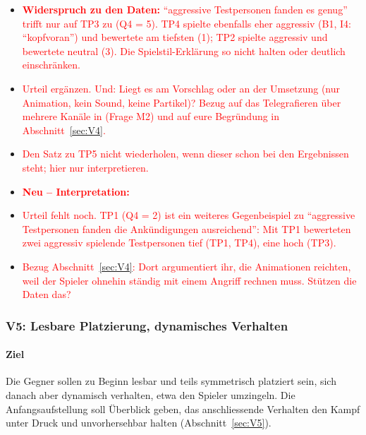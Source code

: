 \documentclass[../Main.tex]{subfiles}
\begin{document}
\begin{itemize}[leftmargin=1.5cm]
    \item \textcolor{red}{\textbf{Widerspruch zu den Daten:} \enquote{aggressive Testpersonen fanden es genug} trifft nur auf TP3 zu (Q4 = 5). TP4 spielte ebenfalls eher aggressiv (B1, I4: \enquote{kopfvoran}) und bewertete am tiefsten (1); TP2 spielte aggressiv und bewertete neutral (3). Die Spielstil-Erklärung so nicht halten oder deutlich einschränken.}
    \item \textcolor{red}{Urteil ergänzen. Und: Liegt es am Vorschlag oder an der Umsetzung (nur Animation, kein Sound, keine Partikel)? Bezug auf das Telegrafieren über mehrere Kanäle in  (Frage M2) und auf eure Begründung in Abschnitt~\ref{sec:V4}.}
    \item \textcolor{red}{Den Satz zu TP5 nicht wiederholen, wenn dieser schon bei den Ergebnissen steht; hier nur interpretieren.}
\end{itemize}

\begin{itemize}[leftmargin=1.5cm]
    \item \textcolor{red}{\textbf{Neu -- Interpretation:}}
    \item \textcolor{red}{Urteil fehlt noch. TP1 (Q4 = 2) ist ein weiteres Gegenbeispiel zu \enquote{aggressive Testpersonen fanden die Ankündigungen ausreichend}: Mit TP1 bewerteten zwei aggressiv spielende Testpersonen tief (TP1, TP4), eine hoch (TP3).}
    \item \textcolor{red}{Bezug Abschnitt~\ref{sec:V4}: Dort argumentiert ihr, die Animationen reichten, weil der Spieler ohnehin ständig mit einem Angriff rechnen muss. Stützen die Daten das?}
\end{itemize}

\subsubsection{V5: Lesbare Platzierung, dynamisches Verhalten}

\paragraph{Ziel}
Die Gegner sollen zu Beginn lesbar und teils symmetrisch platziert sein, sich danach aber dynamisch verhalten, etwa den Spieler umzingeln. Die Anfangsaufstellung soll Überblick geben, das anschliessende Verhalten den Kampf unter Druck und unvorhersehbar halten (Abschnitt~\ref{sec:V5}).
\end{document}
